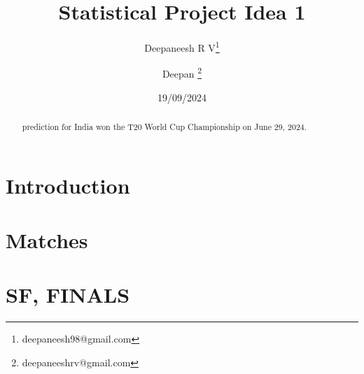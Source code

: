 \documentclass[10 pt, two column] {article}
\title{Statistical Project Idea 1}
\author[a] {Deepaneesh R V\thanks{deepaneesh98@gmail.com}}
\author[b]{Deepan  \thanks{deepaneeshrv@gmail.com}}
\affil[a] {Salem ,Tamil Nadu}
\affil{Tamil Nadu ,India}
\date{19/09/2024}
\begin{document}
	\maketitle
	\begin{abstract}
	 prediction for	India won the T20 World Cup Championship on June 29, 2024.
	\end{abstract}
	\section{Introduction}
	\hspace{0.16in}
	\blindtext[2] \cite{toi,tnie, th}
	\section{Matches}
	\blindtext[1]
	\section{SF, FINALS}
	\blindtext[1]
	\begin{thebibliography}{4}
	\end{thebibliography}
\end{document}
